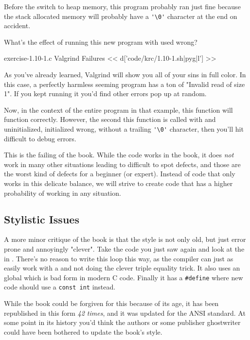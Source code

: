 Before the switch to heap memory, this program probably ran just fine
because the stack allocated memory will probably have a \verb|'\0'| character
at the end on accident.

What's the effect of running this new program with  used wrong?

\begin{code}{exercise-1.10-1.c Valgrind Failures}
<< d['code/krc/1.10-1.sh|pyg|l'] >>
\end{code}

As you've already learned, Valgrind will show you all of your sins in full
color.  In this case, a perfectly harmless seeming program has a ton of
"Invalid read of size 1".  If you kept running it you'd find other errors pop
up at random.

Now, in the context of the entire program in that example, this function
will function correctly.  However, the second this function is called with
 and  uninitialized, initialized wrong, 
without a trailing \verb|'\0'| character, then you'll hit difficult to debug
errors.

This is the failing of the book.  While the code works in the book, it does
\emph{not} work in many other situations leading to difficult to spot defects,
and those are the worst kind of defects for a beginner (or expert).
Instead of code that only works in this delicate balance, we will strive to
create code that has a higher probability of working in any situation.


\subsection{Stylistic Issues}

A more minor critique of the book is that the style is not only old, but just
error prone and annoyingly "clever".  Take the code you just saw again and look
at the  in .  There's no reason to write this
loop this way, as the compiler can just as easily work with a 
and not doing the clever triple equality trick.  It also uses an 
global which is bad form in modern C code.  Finally it has a \verb|#define|
where new code should use a \verb|const int| instead.

While the book could be forgiven for this because of its age, it has been
republished in this form \emph{42 times}, and it was updated for the ANSI
standard.  At some point in its history you'd think the authors or some
publisher ghostwriter could have been bothered to update the book's style.

